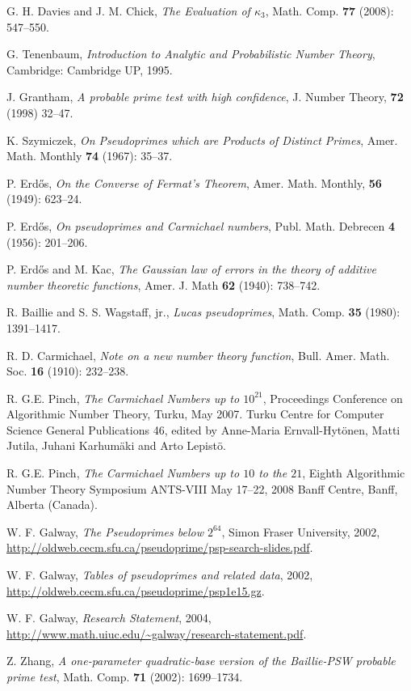 \documentclass[11pt]{article}
\theoremstyle{plain}
\theoremstyle{definition}
\theoremstyle{remark}
\numberwithin{equation}{subsection}
\begin{document}
{\begin{thebibliography}{13}
G. H. Davies and J. M. Chick, \emph{The Evaluation of $\kappa_3$}, Math. Comp. \textbf{77} (2008): 547--550.

G. Tenenbaum, \emph{Introduction to Analytic and Probabilistic Number Theory}, Cambridge: Cambridge UP, 1995.

J. Grantham, \emph{A probable prime test with high confidence}, J. Number Theory, \textbf{72} (1998) 32--47.

K. Szymiczek, \emph{On Pseudoprimes which are Products of Distinct Primes}, Amer. Math. Monthly \textbf{74} (1967): 35--37.

P. Erd\H{o}s, \emph{On the Converse of Fermat's Theorem}, Amer. Math. Monthly, \textbf{56} (1949): 623--24.

P. Erd\H{o}s, \emph{On pseudoprimes and Carmichael numbers}, Publ. Math. Debrecen \textbf{4} (1956): 201--206.

P. Erd\H{o}s and M. Kac, \emph{The Gaussian law of errors in the theory of additive number theoretic functions}, Amer. J. Math \textbf{62} (1940): 738--742.

R. Baillie and S. S. Wagstaff, jr., \emph{Lucas pseudoprimes}, Math. Comp. \textbf{35} (1980): 1391--1417.

R. D. Carmichael, \emph{Note on a new number theory function}, Bull. Amer. Math. Soc. \textbf{16} (1910): 232--238.

R. G.E. Pinch, \emph{The Carmichael Numbers up to $10^{21}$}, Proceedings Conference on Algorithmic Number Theory, Turku, May 2007. Turku Centre for Computer Science General Publications 46, edited by Anne-Maria Ernvall-Hyt\"{o}nen, Matti Jutila, Juhani Karhum\"{a}ki and Arto Lepist\"{o}.

R. G.E. Pinch, \emph{The Carmichael Numbers up to $10$ to the $21$}, Eighth Algorithmic Number Theory Symposium ANTS-VIII May 17--22, 2008 Banff Centre, Banff, Alberta (Canada).

W. F. Galway, \emph{The Pseudoprimes below $2^{64}$}, Simon Fraser University, 2002, \url{http://oldweb.cecm.sfu.ca/pseudoprime/psp-search-slides.pdf}.

W. F. Galway, \emph{Tables of pseudoprimes and related data}, 2002, \url{http://oldweb.cecm.sfu.ca/pseudoprime/psp1e15.gz}.

W. F. Galway, \emph{Research Statement}, 2004, \url{http://www.math.uiuc.edu/~galway/research-statement.pdf}.

Z. Zhang, \emph{A one-parameter quadratic-base version of the Baillie-PSW probable prime test}, Math. Comp. \textbf{71} (2002): 1699--1734.

\end{thebibliography}}
\end{document}
